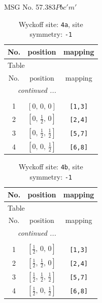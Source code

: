 \documentclass[fleqn,8pt]{jsarticle}
\begin{document}
\setcounter{MaxMatrixCols}{32}

\renewcommand{\tablename}{Table~}
\renewcommand{\figurename}{Figure~}
\begin{center}
\LARGE
MSG No. 57.383\quad$Pbc'm'$
\end{center}
\renewcommand{\arraystretch}{1.2}
\begin{longtable}{ccc}
\caption{Wyckoff site: {\tt 4a}, site symmetry: {\tt -1}}
 \\
 \hline \hline
No. & position & mapping \\ \hline \endfirsthead

\multicolumn{2}{l}{\tablename\ \thetable{}} \\
 \hline \hline
No. & position & mapping \\ \hline \endhead

 \hline \hline
\multicolumn{2}{r}{\footnotesize\it continued ...} \\ \endfoot

 \hline \hline
\multicolumn{2}{r}{} \\ \endlastfoot

1 & $\left[ 0,\, 0,\, 0 \right]$ & {\tt [1,3]} \\ \hline
2 & $\left[ 0,\, \frac{1}{2},\, 0 \right]$ & {\tt [2,4]} \\ \hline
3 & $\left[ 0,\, \frac{1}{2},\, \frac{1}{2} \right]$ & {\tt [5,7]} \\ \hline
4 & $\left[ 0,\, 0,\, \frac{1}{2} \right]$ & {\tt [6,8]} \\
\end{longtable}
\renewcommand{\arraystretch}{1.2}
\begin{longtable}{ccc}
\caption{Wyckoff site: {\tt 4b}, site symmetry: {\tt -1}}
 \\
 \hline \hline
No. & position & mapping \\ \hline \endfirsthead

\multicolumn{2}{l}{\tablename\ \thetable{}} \\
 \hline \hline
No. & position & mapping \\ \hline \endhead

 \hline \hline
\multicolumn{2}{r}{\footnotesize\it continued ...} \\ \endfoot

 \hline \hline
\multicolumn{2}{r}{} \\ \endlastfoot

1 & $\left[ \frac{1}{2},\, 0,\, 0 \right]$ & {\tt [1,3]} \\ \hline
2 & $\left[ \frac{1}{2},\, \frac{1}{2},\, 0 \right]$ & {\tt [2,4]} \\ \hline
3 & $\left[ \frac{1}{2},\, \frac{1}{2},\, \frac{1}{2} \right]$ & {\tt [5,7]} \\ \hline
4 & $\left[ \frac{1}{2},\, 0,\, \frac{1}{2} \right]$ & {\tt [6,8]} \\
\end{longtable}
\end{document}
